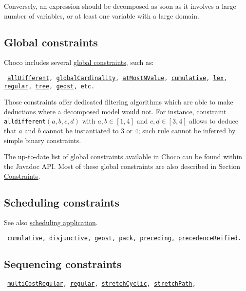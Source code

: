 Conversely, an expression should be decomposed as soon as it involves a large number of variables, or at least one variable with a large domain.

\subsection{Global constraints}\label{model:advancedconstraints}\hypertarget{model:advancedconstraints}{}
Choco includes several \href{http://www.emn.fr/x-info/sdemasse/gccat/}{global constraints}, such as:
\begin{notedef}\tt
\hyperlink{alldifferent:alldifferentconstraint}{allDifferent}, 
\hyperlink{globalcardinality:globalcardinalityconstraint}{globalCardinality}, 
\hyperlink{atmostnvalue:atmostnvalueconstraint}{atMostNValue},
\hyperlink{cumulative:cumulativeconstraint}{cumulative}, 
\hyperlink{lex:lexconstraint}{lex}, 
\hyperlink{regular:regularconstraint}{regular},
 \hyperlink{tree:treeconstraint}{tree},
\hyperlink{geost:geostconstraint}{geost}, etc.
\end{notedef}
Those constraints offer dedicated filtering algorithms which are able to make deductions where a decomposed model would not.
For instance, constraint \texttt{alldifferent}$(a,b,c,d)$ with $a,b\in[1,4]$ and $c,d\in[3,4]$ allows to deduce that $a$ and $b$ cannot be instantiated to $3$ or $4$; such rule cannot be inferred by simple binary constraints. 

The up-to-date list of global constraints available in Choco can be found within the Javadoc API.
Most of these global constraints are also described in Section \hyperlink{ch:constraints}{Constraints}.

\subsection{Scheduling constraints}\label{model:schedulingconstraints}\hypertarget{model:schedulingconstraints}{}
See also \hyperlink{schedulinganduseofthecumulative:schedulinganduseofthecumulativeconstraint}{scheduling application}.
\begin{notedef}\tt
\hyperlink{cumulative:cumulativeconstraint}{cumulative}, \hyperlink{disjunctive:disjunctiveconstraint}{disjunctive}, \hyperlink{geost:geostconstraint}{geost}, \hyperlink{pack:packconstraint}{pack}, \hyperlink{preceding:precedingconstraint}{preceding}, \hyperlink{precedencereified:precedencereifiedconstraint}{precedenceReified}.
\end{notedef}

\subsection{Sequencing constraints}\label{model:theregularconstraint}\hypertarget{model:theregularconstraint}{}
\begin{notedef}\tt
  \hyperlink{multicostregular:multicostregularconstraint}{multiCostRegular}, \hyperlink{regular:regularconstraint}{regular}, \hyperlink{stretchcyclic:stretchcyclicconstraint}{stretchCyclic}, \hyperlink{stretchpath:stretchpathconstraint}{stretchPath}, 
\end{notedef}

